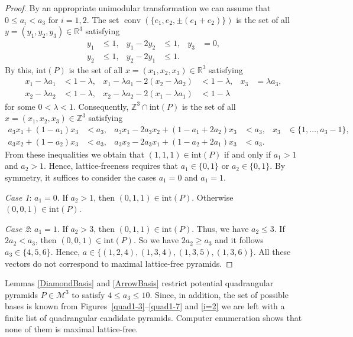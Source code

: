 \documentclass[a4paper]{article}
\theoremstyle{plain}
\begin{document}
\begin{proof}
By an appropriate unimodular transformation we can assume
that $0 \le a_i < a_3$ for $i = 1,2$.
The set ${{\mathop{\mathrm{{conv}}}}}(\{e_1, e_2, \pm(e_1+e_2)\})$ is the set of
all $y = (y_1, y_2, y_3) \in {\mathbb{R}}^3$ satisfying 
\begin{align*}
  y_1 & \le 1, & y_1 - 2 y_2 & \le 1, & y_3 & = 0, \\
  y_2 & \le 1, & y_2 - 2 y_1 & \le 1. & &
\end{align*}
By this, ${\mathrm{int}}(P)$ is the set of all $x = (x_1, x_2, x_3)
\in {\mathbb{R}}^3$ satisfying
\begin{align*}
  x_1 - \lambda a_1 & < 1 - \lambda, &
  x_1 - \lambda a_1 - 2 (x_2 - \lambda a_2) &
  < 1 - \lambda, & x_3 & = \lambda a_3, \\
  x_2 - \lambda a_2 &
  < 1 - \lambda, & x_2 - \lambda a_2 - 2 (x_1 - \lambda a_1) &
  < 1 - \lambda & & 
\end{align*}
for some $0 < \lambda < 1$. Consequently, ${\mathbb{Z}}^3 \cap
{\mathrm{int}}(P)$ is the set of all $x = (x_1, x_2, x_3) \in {\mathbb{Z}}^3$
satisfying
\begin{align*}
  a_3 x_1 + (1 - a_1) x_3 & < a_3, &
  a_3 x_1 - 2a_3 x_2 + (1 - a_1 + 2a_2) x_3 & < a_3, &
  x_3 & \in \{1,\ldots, a_3 - 1\}, \\
  a_3 x_2 + (1 - a_2) x_3 & < a_3, &
  a_3 x_2 - 2a_3 x_1 + (1 - a_2 + 2a_1) x_3 & < a_3.
\end{align*}
From these inequalities we obtain that $(1,1,1) \in
{\mathrm{int}}(P)$ if and only if $a_1 > 1$ and $a_2 > 1$.
Hence, lattice-freeness requires that $a_1 \in \{0,1\}$ or
$a_2 \in \{0,1\}$.
By symmetry, it suffices to consider the cases $a_1 = 0$ and
$a_1 = 1$.

\emph{Case 1}: $a_1 = 0$.
If $a_2 > 1$, then $(0,1,1) \in {\mathrm{int}}(P)$.
Otherwise $(0,0,1) \in {\mathrm{int}}(P)$.

\emph{Case 2}: $a_1 = 1$.
If $a_2 > 3$, then $(0,1,1) \in {\mathrm{int}}(P)$.
Thus, we have $a_2 \le 3$.
If $2 a_2 < a_3$, then $(0,0,1) \in {\mathrm{int}}(P)$.
So we have $2 a_2 \ge a_3$ and it follows $a_3 \in
\{4,5,6\}$.
Hence, $a \in \{(1,2,4), (1,3,4), (1,3,5), (1,3,6)\}$.
All these vectors do not correspond to maximal lattice-free
pyramids.
\end{proof}

Lemmas \ref{DiamondBasis} and \ref{ArrowBasis} restrict
potential quadrangular pyramids $P \in {\mathcal{M}^3}$ to satisfy $4
\leq a_3 \leq 10$.
Since, in addition, the set of possible bases is known from
Figures~\ref{quad1-3}--\ref{quad1-7} and \ref{i=2} we are
left with a finite list of quadrangular candidate pyramids.
Computer enumeration shows that none of them is maximal
lattice-free.
\end{document}
